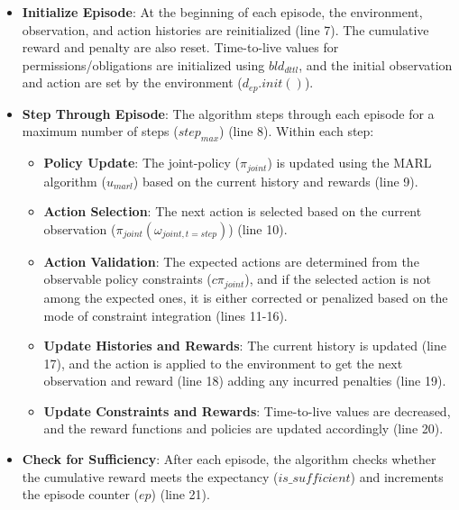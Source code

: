 \documentclass[conference]{IEEEtran}
\begin{document}
\begin{itemize}
    \item \textbf{Initialize Episode}:
          At the beginning of each episode, the environment, observation, and action histories are reinitialized (line 7). The cumulative reward and penalty are also reset. Time-to-live values for permissions/obligations are initialized using $bld_{dttl}$, and the initial observation and action are set by the environment ($d_{ep}.init()$).

    \item \textbf{Step Through Episode}:
          The algorithm steps through each episode for a maximum number of steps ($step_{max}$) (line 8). Within each step:

          \begin{itemize}
              \item \textbf{Policy Update}:
                    The joint-policy ($\pi_{joint}$) is updated using the MARL algorithm ($u_{marl}$) based on the current history and rewards (line 9).

              \item \textbf{Action Selection}:
                    The next action is selected based on the current observation ($\pi_{joint}(\omega_{joint,t=step})$) (line 10).

              \item \textbf{Action Validation}:
                    The expected actions are determined from the observable policy constraints ($c\pi_{joint}$), and if the selected action is not among the expected ones, it is either corrected or penalized based on the mode of constraint integration (lines 11-16).

              \item \textbf{Update Histories and Rewards}:
                    The current history is updated (line 17), and the action is applied to the environment to get the next observation and reward (line 18) adding any incurred penalties (line 19).

              \item \textbf{Update Constraints and Rewards}:
                    Time-to-live values are decreased, and the reward functions and policies are updated accordingly (line 20).
          \end{itemize}

    \item \textbf{Check for Sufficiency}:
          After each episode, the algorithm checks whether the cumulative reward meets the expectancy ($is\_sufficient$) and increments the episode counter ($ep$) (line 21).
\end{itemize}
\end{document}
